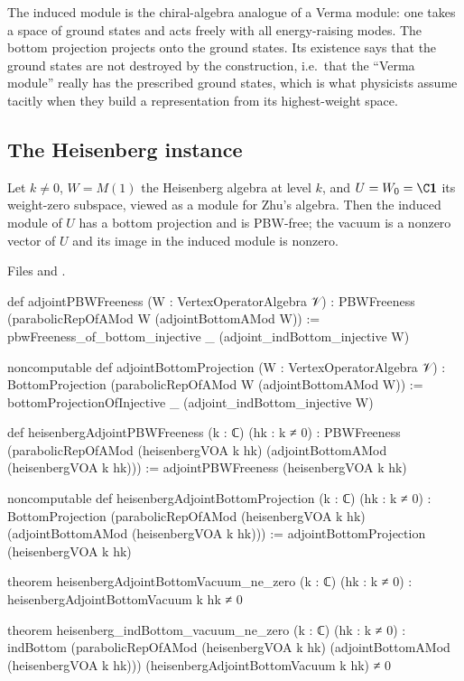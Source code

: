 \begin{physics}
The induced module is the chiral-algebra analogue of a Verma module: one takes a space of ground states and
acts freely with all energy-raising modes. The bottom projection projects onto the ground states.
Its existence says that the ground states are not destroyed by the construction, i.e.\ that the ``Verma
module'' really has the prescribed ground states, which is what physicists assume tacitly when they build a
representation from its highest-weight space.
\end{physics}

\subsection{The Heisenberg instance}

\begin{theorem}\label{l05:thm:pbw}
Let $k\ne0$, $W=M(1)$ the Heisenberg algebra at level $k$, and $U=W_0=\C\lfivevac$ its weight-zero subspace,
viewed as a module for Zhu's algebra. Then the induced module of $U$ has a bottom projection and is PBW-free;
the vacuum is a nonzero vector of $U$ and its image in the induced module is nonzero.
\end{theorem}

\noindent Files  and
.
\begin{leancode}
def adjointPBWFreeness (W : VertexOperatorAlgebra 𝒱) :
    PBWFreeness (parabolicRepOfAMod W (adjointBottomAMod W)) :=
  pbwFreeness_of_bottom_injective _ (adjoint_indBottom_injective W)

noncomputable def adjointBottomProjection (W : VertexOperatorAlgebra 𝒱) :
    BottomProjection (parabolicRepOfAMod W (adjointBottomAMod W)) :=
  bottomProjectionOfInjective _ (adjoint_indBottom_injective W)

def heisenbergAdjointPBWFreeness (k : ℂ) (hk : k ≠ 0) :
    PBWFreeness
      (parabolicRepOfAMod (heisenbergVOA k hk) (adjointBottomAMod (heisenbergVOA k hk))) :=
  adjointPBWFreeness (heisenbergVOA k hk)

noncomputable def heisenbergAdjointBottomProjection (k : ℂ) (hk : k ≠ 0) :
    BottomProjection
      (parabolicRepOfAMod (heisenbergVOA k hk) (adjointBottomAMod (heisenbergVOA k hk))) :=
  adjointBottomProjection (heisenbergVOA k hk)

theorem heisenbergAdjointBottomVacuum_ne_zero (k : ℂ) (hk : k ≠ 0) :
    heisenbergAdjointBottomVacuum k hk ≠ 0

theorem heisenberg_indBottom_vacuum_ne_zero (k : ℂ) (hk : k ≠ 0) :
    indBottom
        (parabolicRepOfAMod (heisenbergVOA k hk) (adjointBottomAMod (heisenbergVOA k hk)))
        (heisenbergAdjointBottomVacuum k hk) ≠ 0
\end{leancode}

